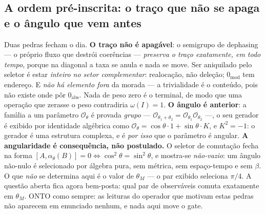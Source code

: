 \documentclass[11pt]{article}
\theoremstyle{definition}\newtheorem{deriv}{Derivação}
\begin{document}
\subsection*{A ordem pr\'e-inscrita: o tra\c{c}o que n\~ao se apaga e o \^angulo que vem antes}Duas pedras fecham o dia. \textbf{O tra\c{c}o n\~ao \'e apag\'avel}: o semigrupo de dephasing --- o pr\'oprio fluxo que destr\'oi coer\^encias --- \emph{preserva o tra\c{c}o exatamente, em todo tempo}, porque na diagonal a taxa se anula e nada se move. Ser aniquilado pelo seletor \'e estar \emph{inteiro no setor complementar}: realoca\c{c}\~ao, n\~ao dele\c{c}\~ao; $0_{\mathrm{mod}}$ tem endere\c{c}o. E \emph{n\~ao h\'a elemento fora} da morada --- a trivialidade \'e o conte\'udo, pois n\~ao existe onde p\^or $0_{\mathrm{abs}}$. Nada de peso zero \'e o terminal, de modo que uma opera\c{c}\~ao que zerasse o peso contradiria $\omega(I)=1$. \textbf{O \^angulo \'e anterior}: a fam\'\i{}lia a um par\^ametro $\mathcal{O}_\theta$ \'e provada \emph{grupo} --- $\mathcal{O}_{\theta_1+\theta_2} = \mathcal{O}_{\theta_1}\mathcal{O}_{\theta_2}$ ---, o seu gerador \'e exibido por identidade alg\'ebrica como $\mathcal{O}_\theta = \cos\theta\cdot 1 + \sin\theta\cdot K$, e $K^2 = -1$: o gerador \'e uma estrutura complexa, e \'e \emph{por isso} que o par\^ametro \'e angular. \textbf{A angularidade \'e consequ\^encia, n\~ao postulado.} O seletor de comuta\c{c}\~ao fecha na forma $[A,\alpha_\theta(B)]=0 \iff \cos^2\theta = \sin^2\theta$, e mostra-se \emph{n\~ao-vazio}: um \^angulo n\~ao-nulo \'e selecionado por \'algebra pura, sem m\'etrica, sem espa\c{c}o-tempo e sem $\beta$. O que \emph{n\~ao} se determina aqui \'e o valor de $\theta_M$ --- o par exibido seleciona $\pi/4$. A quest\~ao aberta fica agora bem-posta: qual par de observ\'aveis comuta exatamente em $\theta_M$. \textsf{ONTO} como sempre: as leituras do operador que motivam estas pedras n\~ao aparecem em enunciado nenhum, e nada aqui move o gate.
\end{document}
